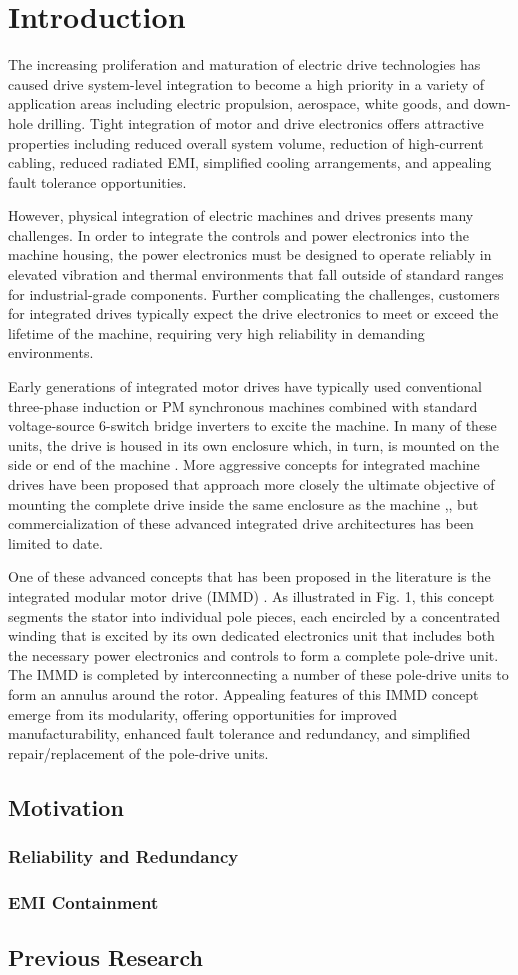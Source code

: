 \chapter{Introduction}
The increasing proliferation and maturation of electric drive technologies has
caused drive system-level integration to become a high priority in a variety
of application areas including electric propulsion, aerospace, white goods,
and down-hole drilling.
Tight integration of motor and drive electronics
offers attractive properties including reduced overall system volume,
reduction of high-current cabling, reduced radiated EMI, simplified cooling
arrangements, and appealing fault tolerance opportunities.

However, physical integration of electric machines and drives presents many
challenges.
In order to integrate the controls and power electronics into the
machine housing, the power electronics must be designed to operate reliably in
elevated vibration and thermal environments that fall outside of standard
ranges for industrial-grade components.
Further complicating the
challenges, customers for integrated drives typically expect the drive
electronics to meet or exceed the lifetime of the machine, requiring very high
reliability in demanding environments.

Early generations of integrated motor drives have typically used conventional
three-phase induction or PM synchronous machines combined with standard
voltage-source 6-switch bridge inverters to excite the machine.
In many of
these units, the drive is housed in its own enclosure which, in turn, is
mounted on the side or end of the machine .
More aggressive concepts for
integrated machine drives have been proposed that approach more closely the
ultimate objective of mounting the complete drive inside the same enclosure as
the machine ,, but commercialization of these advanced integrated drive
architectures has been limited to date.

One of these advanced concepts that has been proposed in the literature is the
integrated modular motor drive (IMMD) .
As illustrated in Fig. 1, this
concept segments the stator into individual pole pieces, each encircled by a
concentrated winding that is excited by its own dedicated electronics unit
that includes both the necessary power electronics and controls to form a
complete pole-drive unit.
The IMMD is completed by interconnecting a number
of these pole-drive units to form an annulus around the rotor.
Appealing features of this IMMD concept emerge from its modularity, offering
opportunities for improved manufacturability, enhanced fault tolerance and
redundancy, and simplified repair/replacement of the pole-drive units.

\section{Motivation}

\subsection{Reliability and Redundancy}

\subsection{EMI Containment}

\section{Previous Research}
